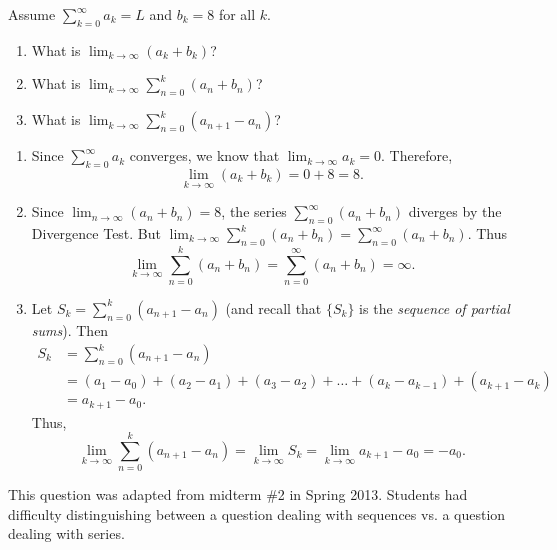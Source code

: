 \documentclass[handout,instructornotes]{ximera}
\begin{document}
\begin{problem}
Assume $\sum_{k=0}^\infty a_k =L$ and $b_k = 8$ for all $k$. 
	\begin{enumerate}
	
	\item  What is $\lim_{k \to \infty} (a_k + b_k)$?
	
	\item  What is $\lim_{k \to \infty} \sum_{n=0}^k (a_n + b_n)$?
	
	\item  What is $\lim_{k \to \infty} \sum_{n=0}^k (a_{n+1} - a_n)$?
	
	\end{enumerate}
	
	\begin{freeResponse}
		\begin{enumerate}
	
		\item  Since $\sum_{k=0}^\infty a_k$ converges, we know that $\lim_{k \to \infty} a_k = 0$.  
		Therefore,
			\[
			\lim_{k \to \infty} (a_k + b_k) = 0 + 8 = \boxed{8}.
			\]
	
		\item  Since $\lim_{n \to \infty} (a_n + b_n) = 8$, the series $\sum_{n=0}^\infty (a_n + b_n)$ diverges by the Divergence Test.  
		But $\lim_{k \to \infty}  \sum_{n=0}^k (a_n + b_n) = \sum_{n=0}^\infty (a_n + b_n)$.  
		Thus
			\[
			\lim_{k \to \infty}  \sum_{n=0}^k (a_n + b_n) = \sum_{n=0}^\infty (a_n + b_n) = \boxed{\infty}.
			\]
	
		\item  Let $S_k = \sum_{n=0}^k (a_{n+1} - a_n)$ (and recall that $\{ S_k \}$ is the {\it sequence of partial sums}).
		Then
			\begin{align*}
			S_k &= \sum_{n=0}^k (a_{n+1} - a_n)  \\
			&= (a_1 - a_0) + (a_2 - a_1) + (a_3 - a_2) + \hdots + (a_k - a_{k-1}) + (a_{k+1} - a_k)  \\
			&= a_{k+1} - a_0.
			\end{align*}
		Thus,
			\[
			\lim_{k \to \infty} \sum_{n=0}^k (a_{n+1} - a_n) = \lim_{k \to \infty} S_k = \lim_{k \to \infty} a_{k+1} - a_0 = \boxed{-a_0}.
			\]
	
		\end{enumerate}
	\end{freeResponse}
		
\end{problem}

\begin{instructorNotes}
This question was adapted from midterm \#2 in Spring 2013.  
Students had difficulty distinguishing between a question dealing with sequences vs. a question dealing with series.
\end{instructorNotes}
\end{document}
